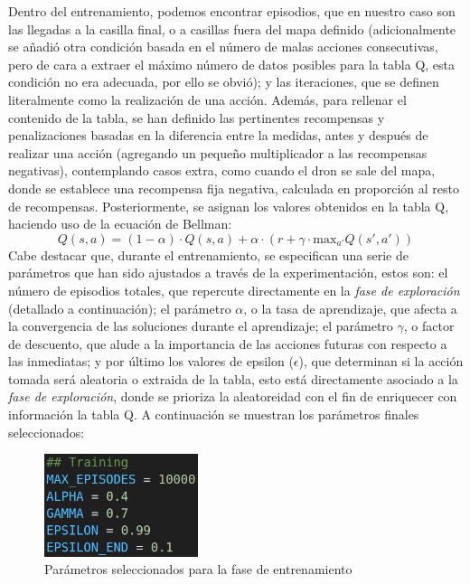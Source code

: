 Dentro del entrenamiento, podemos encontrar episodios, que en nuestro caso son las llegadas a la casilla final, o a casillas fuera del mapa definido (adicionalmente se añadió otra condición basada en el número de malas acciones consecutivas, pero de cara a extraer el máximo número de datos posibles para la tabla Q, esta condición no era adecuada, por ello se obvió); y las iteraciones, que se definen literalmente como la realización de una acción. Además, para rellenar el contenido de la tabla, se han definido las pertinentes recompensas y penalizaciones basadas en la diferencia entre la medidas, antes y después de realizar una acción (agregando un pequeño multiplicador a las recompensas negativas), contemplando casos extra, como cuando el dron se sale del mapa, donde se establece una recompensa fija negativa, calculada en proporción al resto de recompensas. Posteriormente, se asignan los valores obtenidos en la tabla Q, haciendo uso de la ecuación de Bellman:
\begin{equation}
    Q(s, a) = (1 - \alpha) \cdot Q(s, a) + \alpha \cdot \left(r + \gamma \cdot \mathrm{max}_{a'} Q(s', a')\right)
\end{equation}
Cabe destacar que, durante el entrenamiento, se especifican una serie de parámetros que han sido ajustados a través de la experimentación, estos son: el número de episodios totales, que repercute directamente en la \emph{fase de exploración} (detallado a continuación); el parámetro $\alpha$, o la tasa de aprendizaje, que afecta a la convergencia de las soluciones durante el aprendizaje; el parámetro $\gamma$, o factor de descuento, que alude a la importancia de las acciones futuras con respecto a las inmediatas; y por último los valores de epsilon ($\epsilon$), que determinan si la acción tomada será aleatoria o extraida de la tabla, esto está directamente asociado a la \emph{fase de exploración}, donde se prioriza la aleatoreidad con el fin de enriquecer con información la tabla Q. A continuación se muestran los parámetros finales seleccionados:

\begin{figure} [H]
    \begin{center}
    \includegraphics[height=3cm]{imagenes/cap4/7_params.png}
    \end{center}
    \caption[Parámetros seleccionados para la fase de entrenamiento]{Parámetros seleccionados para la fase de entrenamiento}
    \label{fig:params}
\end{figure}

